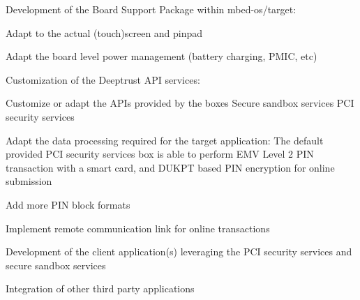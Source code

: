 \begin{DoxyItemize}
\item Development of the Board Support Package within mbed-\/os/target\+:
\begin{DoxyItemize}
\item Adapt to the actual (touch)screen and pinpad
\item Adapt the board level power management (battery charging, P\+M\+IC, etc)
\end{DoxyItemize}
\item Customization of the Deeptrust A\+PI services\+:
\begin{DoxyItemize}
\item Customize or adapt the A\+P\+Is provided by the boxes Secure sandbox services P\+CI security services
\end{DoxyItemize}
\item Adapt the data processing required for the target application\+: The default provided P\+CI security services box is able to perform E\+MV Level 2 P\+IN transaction with a smart card, and D\+U\+K\+PT based P\+IN encryption for online submission
\begin{DoxyItemize}
\item Add more P\+IN block formats
\item Implement remote communication link for online transactions
\end{DoxyItemize}
\item Development of the client application(s) leveraging the P\+CI security services and secure sandbox services
\item Integration of other third party applications
\end{DoxyItemize}